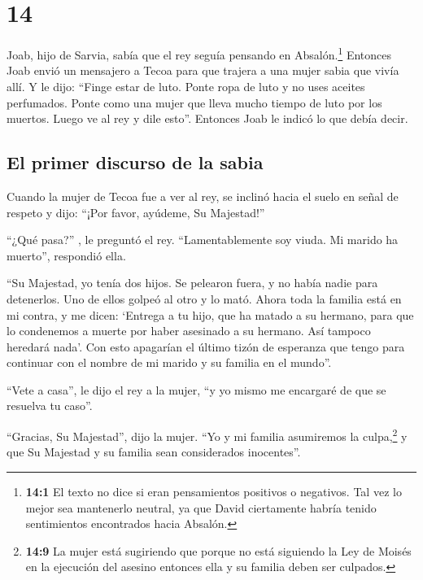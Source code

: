 \hypertarget{section-13}{%
\section{14}\label{section-13}}

 Joab, hijo de Sarvia, sabía que el rey seguía pensando en
Absalón.\footnote{\textbf{14:1} El texto no dice si eran pensamientos
  positivos o negativos. Tal vez lo mejor sea mantenerlo neutral, ya que
  David ciertamente habría tenido sentimientos encontrados hacia
  Absalón.}  Entonces Joab envió un mensajero a Tecoa para
que trajera a una mujer sabia que vivía allí. Y le dijo: ``Finge estar
de luto. Ponte ropa de luto y no uses aceites perfumados. Ponte como una
mujer que lleva mucho tiempo de luto por los muertos. 
Luego ve al rey y dile esto''. Entonces Joab le indicó lo que debía
decir.

\hypertarget{el-primer-discurso-de-la-sabia}{%
\subsection{El primer discurso de la
sabia}\label{el-primer-discurso-de-la-sabia}}

 Cuando la mujer de Tecoa fue a ver al rey, se inclinó
hacia el suelo en señal de respeto y dijo: ``¡Por favor, ayúdeme, Su
Majestad!''

 ``¿Qué pasa?'' , le preguntó el rey. ``Lamentablemente
soy viuda. Mi marido ha muerto'', respondió ella.

 ``Su Majestad, yo tenía dos hijos. Se pelearon fuera, y
no había nadie para detenerlos. Uno de ellos golpeó al otro y lo mató.
 Ahora toda la familia está en mi contra, y me dicen:
`Entrega a tu hijo, que ha matado a su hermano, para que lo condenemos a
muerte por haber asesinado a su hermano. Así tampoco heredará nada'. Con
esto apagarían el último tizón de esperanza que tengo para continuar con
el nombre de mi marido y su familia en el mundo''.

 ``Vete a casa'', le dijo el rey a la mujer, ``y yo mismo
me encargaré de que se resuelva tu caso''.

 ``Gracias, Su Majestad'', dijo la mujer. ``Yo y mi
familia asumiremos la culpa,\footnote{\textbf{14:9} La mujer está
  sugiriendo que porque no está siguiendo la Ley de Moisés en la
  ejecución del asesino entonces ella y su familia deben ser culpados.}
y que Su Majestad y su familia sean considerados inocentes''.

